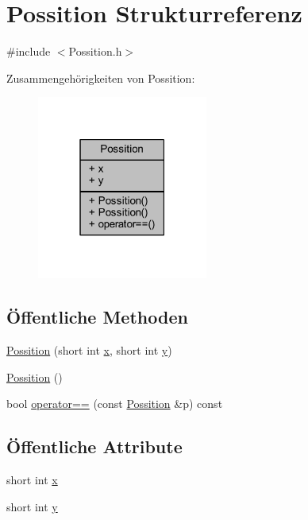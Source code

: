 \hypertarget{struct_possition}{}\section{Possition Strukturreferenz}
\label{struct_possition}


{\ttfamily \#include $<$Possition.\+h$>$}



Zusammengehörigkeiten von Possition\+:\nopagebreak
\begin{figure}[H]
\begin{center}
\leavevmode
\includegraphics[width=159pt]{struct_possition__coll__graph}
\end{center}
\end{figure}
\subsection*{Öffentliche Methoden}
\begin{DoxyCompactItemize}
\item 
\hyperlink{struct_possition_aeca027993a6ef360904208411c5e7708}{Possition} (short int \hyperlink{struct_possition_a07b558914470911fd3c10a745b0c7bc2}{x}, short int \hyperlink{struct_possition_ad3af285b52a6199147abcd48ebf83624}{y})
\item 
\hyperlink{struct_possition_a23d4588228d627c48b7b2c5209271b0d}{Possition} ()
\item 
bool \hyperlink{struct_possition_a53040dcec3906f26210fc328230cc4c4}{operator==} (const \hyperlink{struct_possition}{Possition} \&p) const 
\end{DoxyCompactItemize}
\subsection*{Öffentliche Attribute}
\begin{DoxyCompactItemize}
\item 
short int \hyperlink{struct_possition_a07b558914470911fd3c10a745b0c7bc2}{x}
\item 
short int \hyperlink{struct_possition_ad3af285b52a6199147abcd48ebf83624}{y}
\end{DoxyCompactItemize}


